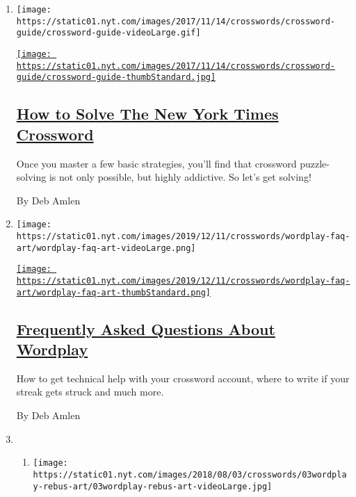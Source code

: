 \begin{enumerate}
\def\labelenumi{\arabic{enumi}.}
\item
  \texttt{[image: https://static01.nyt.com/images/2017/11/14/crosswords/crossword-guide/crossword-guide-videoLarge.gif]}

  \href{/interactive/2017/crosswords/guide-crosswords.html}{\texttt{[image: https://static01.nyt.com/images/2017/11/14/crosswords/crossword-guide/crossword-guide-thumbStandard.jpg]}}

  \hypertarget{how-to-solve-the-new-york-times-crossword}{%
  \subsection{\texorpdfstring{\href{/interactive/2017/crosswords/guide-crosswords.html}{How
  to Solve The New York Times
  Crossword}}{How to Solve The New York Times Crossword}}\label{how-to-solve-the-new-york-times-crossword}}

  Once you master a few basic strategies, you'll find that crossword
  puzzle-solving is not only possible, but highly addictive. So let's
  get solving!

  By Deb Amlen
\item
  \texttt{[image: https://static01.nyt.com/images/2019/12/11/crosswords/wordplay-faq-art/wordplay-faq-art-videoLarge.png]}

  \href{/2019/12/11/crosswords/faq-wordplay-crosswords.html}{\texttt{[image: https://static01.nyt.com/images/2019/12/11/crosswords/wordplay-faq-art/wordplay-faq-art-thumbStandard.png]}}

  \hypertarget{frequently-asked-questions-about-wordplay}{%
  \subsection{\texorpdfstring{\href{/2019/12/11/crosswords/faq-wordplay-crosswords.html}{Frequently
  Asked Questions About
  Wordplay}}{Frequently Asked Questions About Wordplay}}\label{frequently-asked-questions-about-wordplay}}

  How to get technical help with your crossword account, where to write
  if your streak gets struck and much more.

  By Deb Amlen
\item
  \begin{enumerate}
  \def\labelenumii{\arabic{enumii}.}
  \item
    \texttt{[image: https://static01.nyt.com/images/2018/08/03/crosswords/03wordplay-rebus-art/03wordplay-rebus-art-videoLarge.jpg]}


\end{enumerate}
\end{enumerate}
